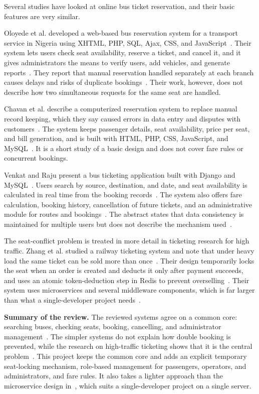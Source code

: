Several studies have looked at online bus ticket reservation, and their basic features are very similar.

Oloyede et al. developed a web-based bus reservation system for a transport service in Nigeria using XHTML, PHP, SQL, Ajax, CSS, and JavaScript~\cite{oloyede}. Their system lets users check seat availability, reserve a ticket, and cancel it, and it gives administrators the means to verify users, add vehicles, and generate reports~\cite{oloyede}. They report that manual reservation handled separately at each branch causes delays and risks of duplicate bookings~\cite{oloyede}. Their work, however, does not describe how two simultaneous requests for the same seat are handled.

Chavan et al. describe a computerized reservation system to replace manual record keeping, which they say caused errors in data entry and disputes with customers~\cite{chavan}. The system keeps passenger details, seat availability, price per seat, and bill generation, and is built with HTML, PHP, CSS, JavaScript, and MySQL~\cite{chavan}. It is a short study of a basic design and does not cover fare rules or concurrent bookings.

Venkat and Raju present a bus ticketing application built with Django and MySQL~\cite{venkat}. Users search by source, destination, and date, and seat availability is calculated in real time from the booking records~\cite{venkat}. The system also offers fare calculation, booking history, cancellation of future tickets, and an administrative module for routes and bookings~\cite{venkat}. The abstract states that data consistency is maintained for multiple users but does not describe the mechanism used~\cite{venkat}.

The seat-conflict problem is treated in more detail in ticketing research for high traffic. Zhang et al. studied a railway ticketing system and note that under heavy load the same ticket can be sold more than once~\cite{zhang}. Their design temporarily locks the seat when an order is created and deducts it only after payment succeeds, and uses an atomic token-deduction step in Redis to prevent overselling~\cite{zhang}. Their system uses microservices and several middleware components, which is far larger than what a single-developer project needs~\cite{zhang}.

\textbf{Summary of the review.} The reviewed systems agree on a common core: searching buses, checking seats, booking, cancelling, and administrator management~\cite{oloyede,chavan,venkat}. The simpler systems do not explain how double booking is prevented, while the research on high-traffic ticketing shows that it is the central problem~\cite{zhang}. This project keeps the common core and adds an explicit temporary seat-locking mechanism, role-based management for passengers, operators, and administrators, and fare rules. It also takes a lighter approach than the microservice design in~\cite{zhang}, which suits a single-developer project on a single server.
